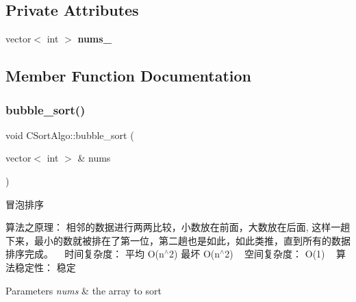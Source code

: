 \subsection*{Private Attributes}
\begin{DoxyCompactItemize}
\item 
\hypertarget{class_c_sort_algo_ae796c28480b9ea83543635bd13fd14fc}{}\label{class_c_sort_algo_ae796c28480b9ea83543635bd13fd14fc} 
vector$<$ int $>$ {\bfseries nums\+\_\+}
\end{DoxyCompactItemize}


\subsection{Member Function Documentation}
\hypertarget{class_c_sort_algo_a0ce54b0167d658aedf0f603979761c88}{}\label{class_c_sort_algo_a0ce54b0167d658aedf0f603979761c88} 
\subsubsection{\texorpdfstring{bubble\+\_\+sort()}{bubble\_sort()}}
{\footnotesize\ttfamily void C\+Sort\+Algo\+::bubble\+\_\+sort (\begin{DoxyParamCaption}\item[{vector$<$ int $>$ \&}]{nums }\end{DoxyParamCaption})\hspace{0.3cm}{\ttfamily [private]}}



冒泡排序 

算法之原理： 相邻的数据进行两两比较，小数放在前面，大数放在后面, 这样一趟下来，最小的数就被排在了第一位，第二趟也是如此，如此类推，直到所有的数据排序完成。 ~\newline
时间复杂度： 平均 O(n$^\wedge$2) 最坏 O(n$^\wedge$2) ~\newline
空间复杂度： O(1) ~\newline
算法稳定性： 稳定 ~\newline

\begin{DoxyParams}{Parameters}
{\em nums} & the array to sort \\
\hline
\end{DoxyParams}
\hypertarget{class_c_sort_algo_ad81a03f9e4a3d1d0a3690485c35acd44}{}\label{class_c_sort_algo_ad81a03f9e4a3d1d0a3690485c35acd44} 
